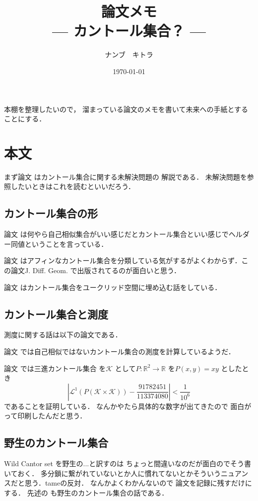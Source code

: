 \documentclass[leqno, a4paper, 12pt]{jsarticle}
\title{論文メモ
\large{\\--- カントール集合？ ---}
}
\author{ナンブ　キトラ}
\date{\today}
\newcommand{\rr}{\mathbb{R}}
\begin{document}
\maketitle

本棚を整理したいので，
溜まっている論文のメモを書いて未来への手紙とすることにする．


\section{本文}
まず論文
\cite{garity2007cantor}
はカントール集合に関する未解決問題の
解説である．
未解決問題を参照したいときはこれを読むといいだろう．


\subsection{カントール集合の形}

論文
\cite{MR1203278}
は何やら自己相似集合がいい感じだとカントール集合といい感じでヘルダー同値ということを言っている．


論文
\cite{MR0961514}
はアフィンなカントール集合を分類している気がするがよくわからず．この論文J. Diff. Geom. で出版されてるのが面白いと思う．

論文
\cite{bellissard2012bi}
はカントール集合をユークリッド空間に埋め込む話をしている．


\subsection{カントール集合と測度}
測度に関する話は以下の論文である．

論文
\cite{MR3153999}
では自己相似ではないカントール集合の測度を計算しているようだ．


論文
\cite{MR4487615}
では三進カントール集合
を$\mathcal{K}$
として$P\colon \rr^{2}\to \rr$
を$P(x, y)=xy$
としたとき
\[
\left|\mathcal{L}^{1}(P(\mathcal{K}\times \mathcal{K}))-
\frac{91782451}{113374080}\right|<\frac{1}{10^{6}}
\]
であることを証明している．
なんかやたら具体的な数字が出てきたので
面白がって印刷したんだと思う．

\subsection{野生のカントール集合}
Wild Cantor set を野生の...と訳すのは
ちょっと間違いなのだが面白のでそう書いておく．
多分鎖に繋がれていないとか人に慣れてないとかそういうニュアンスだと思う．tameの反対．
なんかよくわかんないので
論文を記録に残すだけにする．
先述の\cite{garity2007cantor}
も野生のカントール集合の話である．
\end{document}
